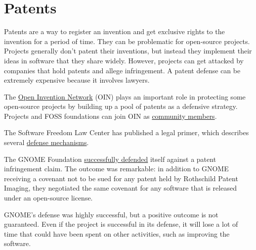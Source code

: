 


\chapter{Patents}

Patents are a way to register an invention and get exclusive rights to the invention for a period of time.  They can be problematic for open-source projects.  Projects generally don't patent their inventions, but instead they implement their ideas in software that they share widely.  However, projects can get attacked by companies that hold patents and allege infringement.  A patent defense can be extremely expensive because it involves lawyers.

The \href{https://openinventionnetwork.com/}{Open Invention Network} (OIN) plays an important role in protecting some open-source projects by building up a pool of patents as a defensive strategy.  Projects and FOSS foundations can join OIN as \href{https://openinventionnetwork.com/our-members/community-members/}{community members}.

The Software Freedom Law Center has published a legal primer, which describes several \href{https://www.softwarefreedom.org/resources/2008/foss-primer.html#x1-390004}{defense mechanisms}.

\begin{kaobox}[frametitle=Patent case against GNOME]

The GNOME Foundation \href{https://foundation.gnome.org/2020/05/20/patent-case-against-gnome-resolved/}{successfully defended} itself against a patent infringement claim.  The outcome was remarkable: in addition to GNOME receiving a covenant not to be sued for any patent held by Rothschild Patent Imaging, they negotiated the same covenant for any software that is released under an open-source license.

GNOME's defense was highly successful, but a positive outcome is not guaranteed.  Even if the project is successful in its defense, it will lose a lot of time that could have been spent on other activities, such as improving the software.

\end{kaobox}


